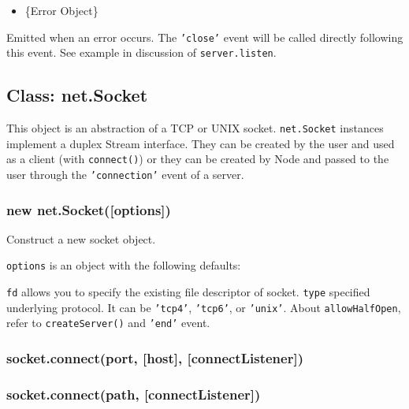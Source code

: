 \begin{itemize}
\item
  \{Error Object\}
\end{itemize}

Emitted when an error occurs. The \texttt{'close'} event will be called
directly following this event. See example in discussion of
\texttt{server.listen}.

\subsection{Class: net.Socket}

This object is an abstraction of a TCP or UNIX socket.
\texttt{net.Socket} instances implement a duplex Stream interface. They
can be created by the user and used as a client (with
\texttt{connect()}) or they can be created by Node and passed to the
user through the \texttt{'connection'} event of a server.

\subsubsection{new net.Socket({[}options{]})}

Construct a new socket object.

\texttt{options} is an object with the following defaults:

\begin{Shaded}
\begin{Highlighting}[]
\NormalTok{\{ }
  \NormalTok{: }
\NormalTok{\}}
\end{Highlighting}
\end{Shaded}

\texttt{fd} allows you to specify the existing file descriptor of
socket. \texttt{type} specified underlying protocol. It can be
\texttt{'tcp4'}, \texttt{'tcp6'}, or \texttt{'unix'}. About
\texttt{allowHalfOpen}, refer to \texttt{createServer()} and
\texttt{'end'} event.

\subsubsection{socket.connect(port, {[}host{]}, {[}connectListener{]})}

\subsubsection{socket.connect(path, {[}connectListener{]})}

